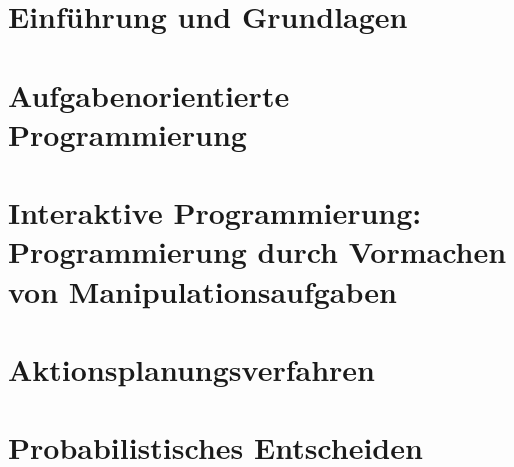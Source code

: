 \documentclass[11pt]{scrartcl}
\begin{document}
\section{Einführung und Grundlagen} %


\section{Aufgabenorientierte Programmierung} %


\section{Interaktive Programmierung: Programmierung durch Vormachen von Manipulationsaufgaben} %



\section{Aktionsplanungsverfahren} %


\section{Probabilistisches Entscheiden} %

\end{document}
